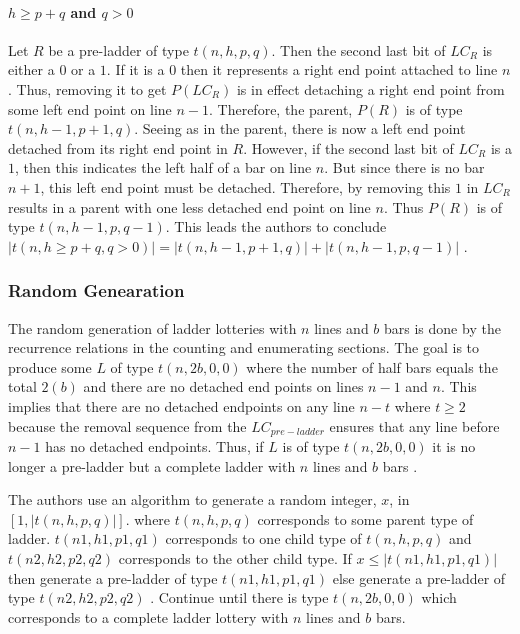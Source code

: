 \paragraph{ $h\geq p+q$ and $q>0$}
Let $R$ be a pre-ladder of type $t(n,h,p,q)$. Then 
the second last bit of $LC_{R}$ is either a $0$ 
or a $1$. If it is a $0$ then it represents a 
right end point attached to line $n$. Thus, 
removing it to get $P(LC_{R})$ is in effect 
detaching a right end point from some left end point 
on line $n-1$. Therefore, the parent, $P(R)$ is 
of type $t(n,h-1,p+1,q)$. Seeing as in the parent, 
there is now a left end point detached from its right 
end point in $R$. However, if the second last bit 
of $LC_{R}$ is a $1$, then this indicates the left 
half of a bar on line $n$. But since there is no 
bar $n+1$, this left end point must be detached. 
Therefore, by removing this $1$ in $LC_{R}$ results 
in a parent with one less detached end point on line $n$.
Thus $P(R)$ is of type $t(n,h-1,p,q-1)$. This leads the 
authors to conclude $|t(n,h\geq p+q,q>0)|=|t(n,h-1,p+1,q)|+|t(n,h-1,p,q-1)|$ \cite{A6}.
\subsubsection{Random Genearation}
The random generation of ladder lotteries with $n$ lines and
$b$ bars is done by the recurrence relations in the counting 
and enumerating sections. The goal is to produce 
some $L$ of type $t(n,2b,0,0)$ where the number of half 
bars equals the total $2(b)$ and there are no detached 
end points on lines $n-1$ and $n$. This implies that there 
are no detached endpoints on any line $n-t$ where $t\geq2$
because the removal sequence from the $LC_{pre-ladder}$
ensures that any line before $n-1$ has no detached endpoints. Thus, 
if $L$ is of type $t(n,2b,0,0)$ it is no longer a pre-ladder 
but a complete ladder with $n$ lines and $b$ bars \cite{A6}.\par 
The authors use an algorithm to generate a random integer, $x$,
in $[1,|t(n,h,p,q)|]$. where $t(n,h,p,q)$ corresponds to some 
parent type of ladder. $t(n1,h1,p1,q1)$ corresponds to one 
child type of $t(n,h,p,q)$ and $t(n2,h2,p2,q2)$ corresponds 
to the other child type. If $x\leq|t(n1,h1,p1,q1)|$ then generate 
a pre-ladder of type $t(n1,h1,p1,q1)$ else generate a pre-ladder 
of type $t(n2,h2,p2,q2)$ \cite{A6}. Continue until there is type $t(n,2b,0,0)$
which corresponds to a complete ladder lottery with $n$ lines and $b$ bars.